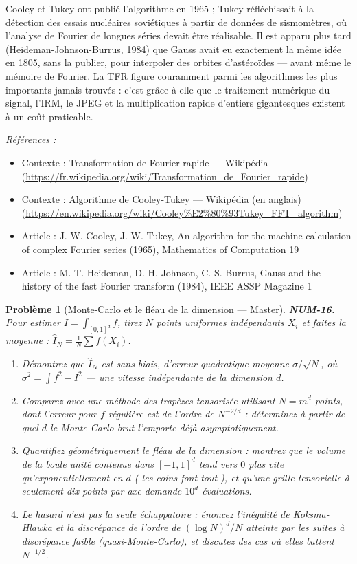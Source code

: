 \documentclass[11pt]{article}
\newtheorem{problem}{Problème}
\newenvironment{refs}{\par\small\noindent\emph{Références :}\begin{itemize}\setlength\itemsep{0pt}}{\end{itemize}\normalsize}
\begin{document}
\noindent Cooley et Tukey ont publié l'algorithme en 1965 ; Tukey réfléchissait
à la détection des essais nucléaires soviétiques à partir de données de sismomètres, où
l'analyse de Fourier de longues séries devait être réalisable. Il est apparu plus tard
(Heideman-Johnson-Burrus, 1984) que Gauss avait eu exactement la même idée en 1805, sans
la publier, pour interpoler des orbites d'astéroïdes --- avant même le mémoire de Fourier.
La TFR figure couramment parmi les algorithmes les plus importants jamais trouvés : c'est
grâce à elle que le traitement numérique du signal, l'IRM, le JPEG et la multiplication
rapide d'entiers gigantesques existent à un coût praticable.

\begin{refs}
\item Contexte : Transformation de Fourier rapide --- Wikipédia (\url{https://fr.wikipedia.org/wiki/Transformation_de_Fourier_rapide})
\item Contexte : Algorithme de Cooley-Tukey --- Wikipédia (en anglais) (\url{https://en.wikipedia.org/wiki/Cooley%E2%80%93Tukey_FFT_algorithm})
\item Article : J. W. Cooley, J. W. Tukey, \og{} An algorithm for the machine calculation of complex Fourier series \fg{} (1965), Mathematics of Computation 19
\item Article : M. T. Heideman, D. H. Johnson, C. S. Burrus, \og{} Gauss and the history of the fast Fourier transform \fg{} (1984), IEEE ASSP Magazine 1
\end{refs}

\bigskip

\begin{problem}[{Monte-Carlo et le fléau de la dimension --- Master}]
\textbf{NUM-16.} Pour estimer $I = \int_{[0,1]^d} f$, tirez
$N$ points uniformes indépendants $X_i$ et faites la moyenne :
$\hat{I}_N = \tfrac{1}{N}\sum f(X_i)$.
\begin{enumerate}
\item[(a)] Démontrez que $\hat{I}_N$ est sans biais, d'erreur
quadratique moyenne $\sigma/\sqrt{N}$, où
$\sigma^2 = \int f^2 - I^2$ --- une vitesse \textit{indépendante de la dimension} $d$.
\item[(b)] Comparez avec une méthode des trapèzes tensorisée utilisant $N = m^d$ points, dont
l'erreur pour $f$ régulière est de l'ordre de $N^{-2/d}$ : déterminez à partir de
quel $d$ le Monte-Carlo brut l'emporte déjà asymptotiquement.
\item[(c)] Quantifiez géométriquement le fléau de la dimension :
montrez que le volume de la boule unité contenue dans $[-1,1]^d$ tend vers $0$ plus
vite qu'exponentiellement en $d$ (\og{} les coins font tout \fg{}), et qu'une grille
tensorielle à seulement dix points par axe demande $10^{d}$ évaluations.
\item[(d)] Le hasard n'est pas la seule échappatoire : énoncez l'inégalité de Koksma-Hlawka et
la discrépance de l'ordre de $(\log N)^d/N$ atteinte par les suites à discrépance
faible (quasi-Monte-Carlo), et discutez des cas où elles battent $N^{-1/2}$.
\end{enumerate}

\end{problem}
\end{document}

